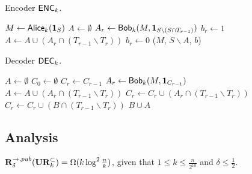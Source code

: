 \begin{algorithm}[H] 
  \caption{Encoder $\textsf{ENC}_k$.} \label{algo:enc4}
  \begin{algorithmic}[1]
    \State $M \leftarrow \mathsf{Alice}_k(\mathbf{1}_S)$
    \State $A\leftarrow \emptyset$
    \State $A_r\leftarrow \mathsf{Bob}_k(M, \mathbf{1}_{S\backslash (S\cap T_{r-1})})$
     
      \State $b_r\leftarrow 1$ 
      \State $A\leftarrow A \cup (A_r\cap (T_{r-1}\backslash T_r))$
    \Else 
      \State $b_r\leftarrow 0$
    \EndIf
    \EndFor
      \State \Return ($M$, $S\backslash A$, $b$) 
    \EndProcedure
  \end{algorithmic}
\end{algorithm}

\begin{algorithm}[H] 
  \caption{Decoder $\textsf{DEC}_k$.} \label{algo:dec4}
  \begin{algorithmic}[1]
    \State $A\leftarrow \emptyset$
    \State $C_0 \leftarrow \emptyset$
      \State $C_r\leftarrow C_{r-1}$
        \State $A_r\leftarrow \mathsf{Bob}_k(M, \mathbf{1}_{C_{r-1}})$ 
        \State $A\leftarrow A \cup (A_r\cap (T_{r-1}\backslash T_r))$
        \State $C_r\leftarrow C_r \cup (A_r\cap (T_{r-1}\backslash T_r))$
      \EndIf
      \State $C_r\leftarrow C_r \cup (B\cap (T_{r-1}\backslash T_r))$
    \EndFor
    \State \Return $B\cup A$ 
    \EndProcedure
  \end{algorithmic}
\end{algorithm}

\subsection{Analysis}

\begin{theorem}
  $\mathbf{R}^{\rightarrow,pub}_\delta(\mathbf{UR}_k^\subset) = \Omega(k\log^2 \frac{n}{k} )$, given that $1 \le k \le \frac{n}{2^{10}}$ and $\delta \le \frac{1}{2}$.
\end{theorem}

